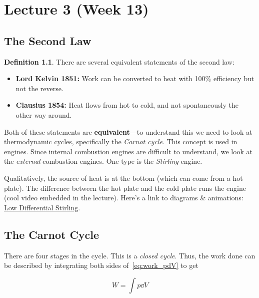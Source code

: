 \documentclass[12pt,chapterprefix=false,dvipsnames]{scrbook}
\theoremstyle{dotless}
\theoremstyle{definition}
\newtheorem{protodefinition}{Definition}[section]
\newenvironment{definition}
{\colorlet{shadecolor}{black!15}\begin{shaded}\begin{protodefinition}}
			{\end{protodefinition}\end{shaded}}
\begin{document}
%

\chapter{Lecture 3 (Week 13)}%
\label{cha:lecture_3}

\section{The Second Law}%
\label{sec:the_second_law}

\begin{definition}
	There are several equivalent statements of the second law:
	\begin{itemize}
		\item \textbf{Lord Kelvin 1851:} Work can be converted to heat with 100\%
		      efficiency but not the reverse.
		\item \textbf{Clausius 1854:} Heat flows from hot to cold, and not
		      spontaneously the other way around.
	\end{itemize}
\end{definition}

Both of these statements are \textbf{equivalent}---to
understand this we need to look at thermodynamic cycles,
specifically the \textit{Carnot cycle}. This concept is used
in engines. Since internal combustion engines are difficult to
understand, we look at the \textit{external} combustion
engines. One type is the \textit{Stirling} engine.

Qualitatively, the source of heat is at the bottom (which can
come from a hot plate). The difference between the hot plate and
the cold plate runs the engine (cool video embedded in the
lecture). Here's a link to diagrams \& animations:
\href{http://animatedengines.com/ltdstirling.html}{Low Differential Stirling}.

\section{The Carnot Cycle}%
\label{sec:the_carnot_cycle}

There are four stages in the cycle. This is a
\textit{closed cycle}. Thus, the work done can be described by
integrating both sides of~\ref{eq:work_pdV} to get

\begin{equation}
	\label{eq:work_pdV_integral_form}
	W = \int p\dd{V}
\end{equation}
\end{document}
